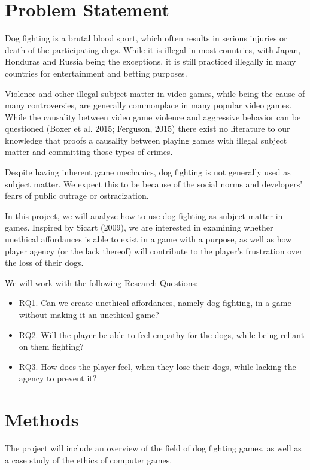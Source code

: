 \documentclass[preprint,12pt, authoryear]{elsarticle}
\begin{document}
\section{Problem Statement}
\label{ProbStat}

Dog fighting is a brutal blood sport, which often results in serious injuries or death of the participating dogs. While it is illegal in most countries, with Japan, Honduras and Russia being the exceptions, it is still practiced illegally in many countries for entertainment and betting purposes. \

Violence and other illegal subject matter in video games, while being the cause of many controversies, are generally commonplace in many popular video games. While the causality between video game violence and aggressive behavior can be questioned (Boxer et al. 2015; Ferguson, 2015) there exist no literature to our knowledge that proofs a causality between playing games with illegal subject matter and committing those types of crimes. \

Despite having inherent game mechanics, dog fighting is not generally used as subject matter. We expect this to be because of the social norms and developers’ fears of public outrage or ostracization. \

In this project, we will analyze how to use dog fighting as subject matter in games. Inspired by Sicart (2009), we are interested in examining whether unethical affordances is able to exist in a game with a purpose, as well as how player agency (or the lack thereof) will contribute to the player’s frustration over the loss of their dogs. \

We will work with the following Research Questions:

\begin{itemize}
\item RQ1. Can we create unethical affordances, namely dog fighting, in a game without making it an unethical game?
\item RQ2. Will the player be able to feel empathy for the dogs, while being reliant on them fighting?
\item RQ3. How does the player feel, when they lose their dogs, while lacking the agency to prevent it?
\end{itemize}

\section{Methods}
The project will include an overview of the field of dog fighting games, as well as a case study of the ethics of computer games. \
\end{document}
